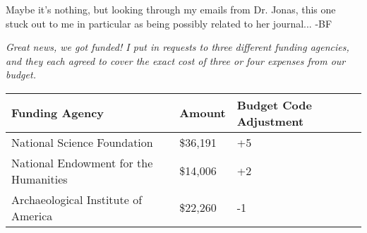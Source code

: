 Maybe it's nothing, but looking through my emails from Dr. Jonas,
this one stuck out to me in particular as being possibly related
to her journal... -BF

\textit{Great news, we got funded! I put in requests to three different funding agencies,
and they each agreed to cover the exact cost of three or four expenses from our budget.}

\begin{center}
\begin{tabular}{lll}
\textbf{Funding Agency}               & \textbf{Amount} & \textbf{Budget Code Adjustment} \\\hline
National Science Foundation           & \$36,191        & +5\\
National Endowment for the Humanities & \$14,006        & +2\\
Archaeological Institute of America   & \$22,260        & -1
\end{tabular}
\end{center}

